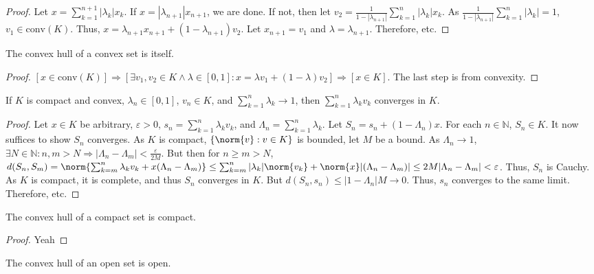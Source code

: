         \begin{proof}
        Let $x=\sum_{k=1}^{n+1}|\lambda_k| x_k$. If $x=|\lambda_{n+1}|x_{n+1}$, we are done. If not, then let $v_2 = \frac{1}{1-|\lambda_{n+1}|}\sum_{k=1}^{n}|\lambda_k|x_k$. As $\frac{1}{1-|\lambda_{n+1}|}\sum_{k=1}^{n}|\lambda_k| = 1$, $v_1\in \textrm{conv}(K)$. Thus, $x = \lambda_{n+1}x_{n+1}+(1-\lambda_{n+1})v_2$. Let $x_{n+1}=v_1$ and $\lambda = \lambda_{n+1}$. Therefore, etc.
        \end{proof}
        \begin{theorem}
        The convex hull of a convex set is itself.
        \end{theorem}
        \begin{proof}
        $[x\in \textrm{conv}(K)]\Rightarrow [\exists v_1,v_2\in K\land \lambda\in[0,1]:x=\lambda v_1+(1-\lambda)v_2]\Rightarrow [x\in K]$. The last step is from convexity.
        \end{proof}
        \begin{theorem}
        If $K$ is compact and convex, $\lambda_n\in[0,1]$, $v_n\in K$, and $\sum_{k=1}^{n}\lambda_k \rightarrow 1$, then $\sum_{k=1}^{n}\lambda_k v_k$ converges in $K$.
        \end{theorem}
        \begin{proof}
        Let $x\in K$ be arbitrary, $\varepsilon>0$, $s_n = \sum_{k=1}^{n}\lambda_k v_k$, and $\Lambda_n = \sum_{k=1}^{n}\lambda_k$. Let $S_n = s_n + (1-\Lambda_n)x$. For each $n\in \mathbb{N}$, $S_n\in K$. It now suffices to show $S_n$ converges. As $K$ is compact, $\{\norm{v}:v\in K\}$ is bounded, let $M$ be a bound. As $\Lambda_n\rightarrow 1$, $\exists N\in \mathbb{N}:n,m>N\Rightarrow |\Lambda_n-\Lambda_m|<\frac{\varepsilon}{2M}$. But then for $n\geq m >N$, $d(S_n,S_m) = \norm{\sum_{k=m}^{n}\lambda_k v_k+x(\Lambda_n-\Lambda_m)} \leq \sum_{k=m}^{n}|\lambda_k| \norm{v_k}+\norm{x}|(\Lambda_n-\Lambda_m)|\leq 2M|\Lambda_{n}-\Lambda_{m}|<\varepsilon$. Thus, $S_n$ is Cauchy. As $K$ is compact, it is complete, and thus $S_n$ converges in $K$. But $d(S_n,s_n)\leq |1-\Lambda_n|M\rightarrow 0$. Thus, $s_n$ converges to the same limit. Therefore, etc.
        \end{proof}
        \begin{theorem}
        The convex hull of a compact set is compact.
        \end{theorem}
        \begin{proof}
        Yeah
        \end{proof}
        \begin{theorem}
        The convex hull of an open set is open.
        \end{theorem}
